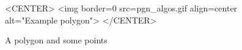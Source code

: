 


\begin{figure}
\begin{ccTexOnly}
\begin{center}   \end{center}
\end{ccTexOnly}
\caption{A polygon and some points
\label{I1_Fig_a_polygon}}
\begin{ccHtmlOnly}
<CENTER>
<img border=0 src=pgn_algos.gif align=center alt="Example polygon">
</CENTER>
\end{ccHtmlOnly}
\end{figure}


